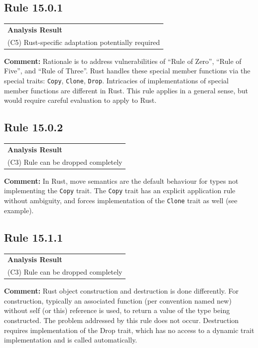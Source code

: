 \subsection*{Rule 15.0.1}
\begin{longtable}{p{13cm}}
\textbf{Analysis Result} \\
(C5) Rust-specific adaptation potentially required \\
\end{longtable}
\textbf{Comment:} Rationale is to address vulnerabilities of ``Rule of Zero'', ``Rule of Five'', and  ``Rule of Three''. Rust handles these special member functions via the special traits: \texttt{Copy}, \texttt{Clone}, \texttt{Drop}. Intricacies of \Cpp implementations of special member functions are different in Rust. This rule applies in a general sense, but would require careful evaluation to apply to Rust. \\
\subsection*{Rule 15.0.2}
\begin{longtable}{p{13cm}}
\textbf{Analysis Result} \\
(C3) Rule can be dropped completely \\
\end{longtable}
\textbf{Comment:} In Rust, move semantics are the default behaviour for types not implementing the \texttt{Copy} trait. The \texttt{Copy} trait has an explicit application rule without ambiguity, and forces implementation of the \texttt{Clone} trait as well (see example). \\


\subsection*{Rule 15.1.1}
\begin{longtable}{p{13cm}}
\textbf{Analysis Result} \\
(C3) Rule can be dropped completely \\
\end{longtable}
\textbf{Comment:} Rust object construction and destruction is done differently. For construction, typically an associated function (per convention named new) without self (or this) reference is used, to return a value of the type being constructed. The problem addressed by this rule does not occur. Destruction requires implementation of the Drop trait, which has no access to a dynamic trait implementation and is called automatically. \\


